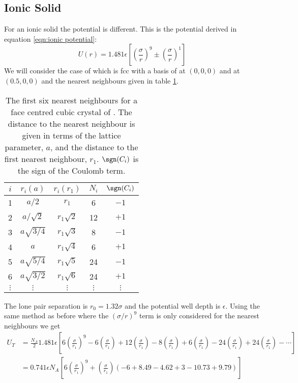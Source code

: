     \subsection{Ionic Solid}
    For an ionic solid the potential is different.
    This is the potential derived in equation \ref{eqn:ionic potential}:
    \[U(r) = 1.481\epsilon\left[\left(\frac{\sigma}{r}\right)^9 \pm \left(\frac{\sigma}{r}\right)^1\right]\]
    We will consider the case of  which is fcc with a basis of  at \((0, 0, 0)\) and  at \((0.5, 0, 0)\) and the nearest neighbours given in table \ref{tab:fcc NaCl nn}.
    \begin{table}[ht]
        \centering
        \begin{tabular}{c|cccc}\hline
            \(i\) & \(r_i(a)\) & \(r_i(r_1)\) & \(N_i\) & \(\sgn(C_i)\)\\\hline
            1 & \(a/2\) & \(r_1\) & 6 & \(-1\)\\
            2 & \(a/\sqrt{2}\) & \(r_1\sqrt{2}\) & 12 & \(+1\)\\
            3 & \(a\sqrt{3/4}\) & \(r_1\sqrt{3}\) & 8 & \(-1\)\\
            4 & \(a\) & \(r_1\sqrt{4}\) & 6 & \(+1\)\\
            5 & \(a\sqrt{5/4}\) & \(r_1\sqrt{5}\) & 24 & \(-1\)\\
            6 & \(a\sqrt{3/2}\) & \(r_1\sqrt{6}\) & 24 & \(+1\)\\
            \(\vdots\) & \(\vdots\) & \(\vdots\) & \(\vdots\) & \(\vdots\) \\\hline
        \end{tabular}
        \caption{The first six nearest neighbours for a face centred cubic crystal of . The distance to the nearest neighbour is given in terms of the lattice parameter, \(a\), and the distance to the first nearest neighbour, \(r_1\). \(\sgn(C_i)\) is the sign of the Coulomb term.}
        \label{tab:fcc NaCl nn}
    \end{table}
    The lone pair separation is \(r_0 = 1.32\sigma\) and the potential well depth is \(\epsilon\).
    Using the same method as before where the \((\sigma/r)^9\) term is only considered for the nearest neighbours we get
    \begin{align*}
        U_T &= \frac{N_A}{2}1.481\epsilon \left[ 6\left(\frac{\sigma}{r_1}\right)^9 - 6\left(\frac{\sigma}{r_1}\right) + 12\left(\frac{\sigma}{r_1}\right) - 8\left(\frac{\sigma}{r_1}\right) + 6\left(\frac{\sigma}{r_1}\right) - 24\left(\frac{\sigma}{r_1}\right) + 24\left(\frac{\sigma}{r_1}\right) - \dotsb\right]\\
        &= 0.741\epsilon N_A\left[6\left(\frac{\sigma}{r_1}\right)^9 + \left(\frac{\sigma}{r_1}\right)\left(-6 + 8.49 - 4.62 + 3 - 10.73 + 9.79\right)\right]
    \end{align*}
